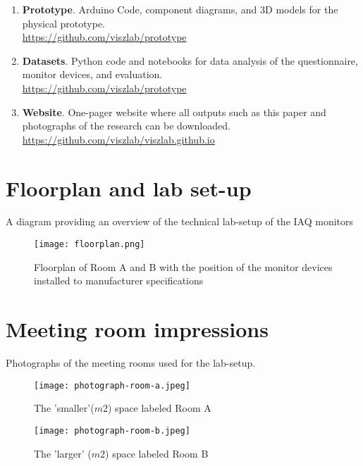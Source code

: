 \begin{appendices}
\begin{enumerate}
  \item \textbf{Prototype}. Arduino Code, component diagrams, and 3D models for the physical prototype.\\
  \underline{https://github.com/viszlab/prototype}
  \item \textbf{Datasets}. Python code and notebooks for data analysis of the questionnaire, monitor devices, and evaluation.\\
  \underline{https://github.com/viszlab/prototype}
  \item \textbf{Website}. One-pager website where all outputs such as this paper and photographs of the research can be downloaded.\\
  \underline{https://github.com/viszlab/viszlab.github.io}  
\end{enumerate}

\pagebreak

\section{Floorplan and lab set-up}
\label{appendix:floorplan}

A diagram providing an overview of the technical lab-setup of the IAQ monitors

\begin{figure}[H]
    \centering
    \texttt{[image: floorplan.png]}
    \caption{Floorplan of Room A and B with the position of the monitor devices installed to manufacturer specifications}
    \label{fig:timeline}
\end{figure}

\section{Meeting room impressions}
\label{appendix:meetings}

Photographs of the meeting rooms used for the lab-setup.

\begin{figure}[H]
\begin{minipage}{.5\textwidth}
    \centering
    \texttt{[image: photograph-room-a.jpeg]}
    \caption{The 'smaller'($m2$) space labeled Room A}
    \label{fig:timeline}
\end{minipage}%
\begin{minipage}{.5\textwidth}
    \centering
    \texttt{[image: photograph-room-b.jpeg]}
    \caption{The 'larger' ($m2$) space labeled Room B}
    \label{fig:timeline}
\end{minipage}%
\end{figure}


\end{appendices}
